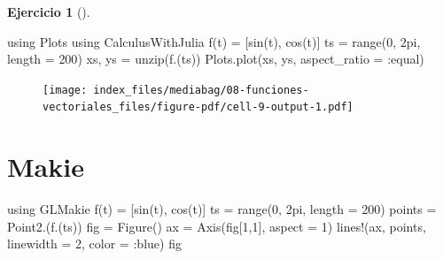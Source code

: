\documentclass[
  a4paper,
]{scrreport}
\newenvironment{Shaded}{\begin{snugshade}}{\end{snugshade}}
\newcommand{\BuiltInTok}[1]{\textcolor[rgb]{0.00,0.23,0.31}{#1}}
\newcommand{\FloatTok}[1]{\textcolor[rgb]{0.68,0.00,0.00}{#1}}
\newcommand{\FunctionTok}[1]{\textcolor[rgb]{0.28,0.35,0.67}{#1}}
\newcommand{\ImportTok}[1]{\textcolor[rgb]{0.00,0.46,0.62}{#1}}
\newcommand{\NormalTok}[1]{\textcolor[rgb]{0.00,0.23,0.31}{#1}}
\newcommand{\OperatorTok}[1]{\textcolor[rgb]{0.37,0.37,0.37}{#1}}
\theoremstyle{definition}
\newtheorem{exercise}{Ejercicio}[chapter]
\theoremstyle{remark}
\begin{document}
\begin{exercise}[]
\begin{enumerate}
\begin{tcolorbox}
\begin{Shaded}
\begin{Highlighting}[]
\ImportTok{using} \BuiltInTok{Plots}
\ImportTok{using} \BuiltInTok{CalculusWithJulia}
\FunctionTok{f}\NormalTok{(t) }\OperatorTok{=}\NormalTok{ [}\FunctionTok{sin}\NormalTok{(t), }\FunctionTok{cos}\NormalTok{(t)] }
\NormalTok{ts }\OperatorTok{=} \FunctionTok{range}\NormalTok{(}\FloatTok{0}\NormalTok{, }\FloatTok{2}\NormalTok{pi, length }\OperatorTok{=} \FloatTok{200}\NormalTok{)}
\NormalTok{xs, ys }\OperatorTok{=} \FunctionTok{unzip}\NormalTok{(}\FunctionTok{f}\NormalTok{.(ts))}
\NormalTok{Plots.}\FunctionTok{plot}\NormalTok{(xs, ys, aspect\_ratio }\OperatorTok{=} \OperatorTok{:}\NormalTok{equal)}
\end{Highlighting}
\end{Shaded}

  \begin{figure}[H]

  {\centering \texttt{[image: index\_files/mediabag/08-funciones-vectoriales\_files/figure-pdf/cell-9-output-1.pdf]}

  }

  \end{figure}

  \section{Makie}

\begin{Shaded}
\begin{Highlighting}[]
\ImportTok{using} \BuiltInTok{GLMakie}
\FunctionTok{f}\NormalTok{(t) }\OperatorTok{=}\NormalTok{ [}\FunctionTok{sin}\NormalTok{(t), }\FunctionTok{cos}\NormalTok{(t)] }
\NormalTok{ts }\OperatorTok{=} \FunctionTok{range}\NormalTok{(}\FloatTok{0}\NormalTok{, }\FloatTok{2}\NormalTok{pi, length }\OperatorTok{=} \FloatTok{200}\NormalTok{)}
\NormalTok{points }\OperatorTok{=} \FunctionTok{Point2}\NormalTok{.(}\FunctionTok{f}\NormalTok{.(ts))}
\NormalTok{fig }\OperatorTok{=} \FunctionTok{Figure}\NormalTok{()}
\NormalTok{ax }\OperatorTok{=} \FunctionTok{Axis}\NormalTok{(fig[}\FloatTok{1}\NormalTok{,}\FloatTok{1}\NormalTok{], aspect }\OperatorTok{=} \FloatTok{1}\NormalTok{)}
\FunctionTok{lines!}\NormalTok{(ax, points, linewidth }\OperatorTok{=} \FloatTok{2}\NormalTok{, color }\OperatorTok{=} \OperatorTok{:}\NormalTok{blue)}
\NormalTok{fig}
\end{Highlighting}
\end{Shaded}


\end{tcolorbox}
\end{enumerate}
\end{exercise}
\end{document}
